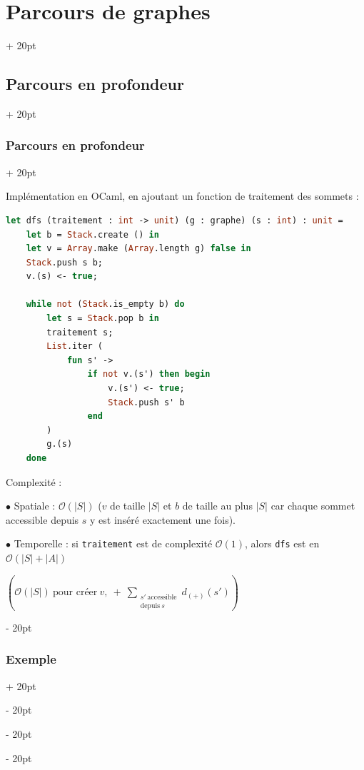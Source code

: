 \documentclass[a4paper, 12pt, twoside]{article}
\newcommand{\lr}[1]{\left( #1 \right)}
\newcommand{\abs}[1]{\left\lvert #1 \right\rvert}
\newcommand{\ind}[1][20pt]{\advance\leftskip + #1}
\newcommand{\deind}[1][20pt]{\advance\leftskip - #1}
\newenvironment{indt}[2][20pt]{#2 \par \ind[#1]}{\par \deind} %
\begin{document}
\begin{indt}{\section{Parcours de graphes}}
\begin{indt}{\subsection{Parcours en profondeur}}
\begin{indt}{\subsubsection{Parcours en profondeur}}
                \vspace{12pt}
                
                Implémentation en OCaml, en ajoutant un fonction de traitement des sommets :

                \begin{lstlisting}[language=Caml, xleftmargin=80pt]
let dfs (traitement : int -> unit) (g : graphe) (s : int) : unit =
    let b = Stack.create () in
    let v = Array.make (Array.length g) false in
    Stack.push s b;
    v.(s) <- true;

    while not (Stack.is_empty b) do
        let s = Stack.pop b in
        traitement s;
        List.iter (
            fun s' ->
                if not v.(s') then begin
                    v.(s') <- true;
                    Stack.push s' b
                end
        )
        g.(s)
    done\end{lstlisting}

                \vspace{12pt}
                
                Complexité :

                $\bullet$ Spatiale : $\mathcal O(\abs S)$ ($v$ de taille $\abs S$ et $b$ de taille au plus $\abs S$ car chaque sommet accessible depuis $s$ y est inséré exactement une fois).

                $\bullet$ Temporelle : si \texttt{traitement} est de complexité $\mathcal O(1)$, alors \texttt{dfs} est en $\mathcal O\!\lr{\abs S + \abs A}$

                $\lr{\mathcal O(\abs S)\ \text{pour créer}\ v,\ +\ \displaystyle \sum_{\substack{s'\ \text{accessible} \\ \text{depuis}\ s}} d_{(+)}(s')}$
            \end{indt}

            \vspace{12pt}
            
            \begin{indt}{\subsubsection{Exemple}}
                \begin{center}
\end{center}
\end{indt}
\end{indt}
\end{indt}
\end{document}
